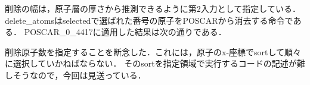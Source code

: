 削除の幅は，原子層の厚さから推測できるように第2入力として指定している．
delete\_atomsはselectedで選ばれた番号の原子をPOSCARから消去する命令である．
POSCAR\_0\_4417に適用した結果は次の通りである．

\begin{Shaded}
\begin{Highlighting}[]
\OperatorTok{>} 
\NormalTok{[}\NormalTok{, 94, 91, 90, 87, 7, 5, 4, 3, 2]}
\end{Highlighting}
\end{Shaded}

削除原子数を指定することを断念した．これには，原子のx-座標でsortして順々に選択していかねばならない．
そのsortを指定領域で実行するコードの記述が難しそうなので，今回は見送っている．

    